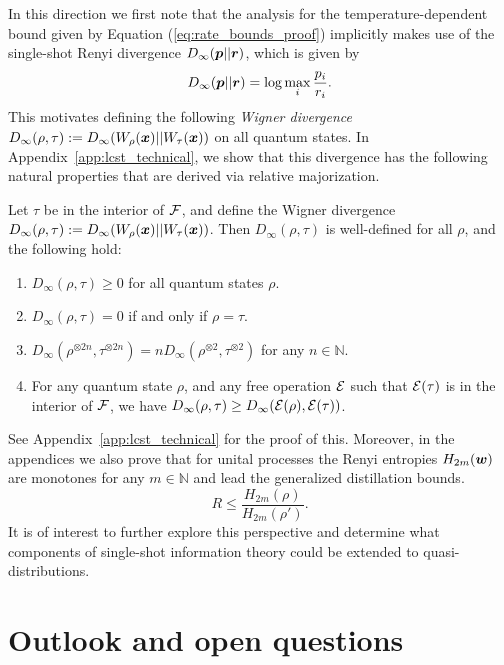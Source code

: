 \documentclass[pra,
aps,
twocolumn,
superscriptaddress,
groupedaddress,
nofootinbib,
reprint
]{revtex4-1}
\begin{document}
In this direction we first note that the analysis for the temperature-dependent bound given by Equation (\ref{eq:rate_bounds_proof}) implicitly makes use of the single-shot Renyi divergence $D_\infty (\boldsymbol{p} ||\boldsymbol{r})$, which is given by
\begin{equation}
D_\infty (\boldsymbol{p} ||\boldsymbol{r}) = \log \max_i \frac{p_i}{r_i}.
\end{equation}
This motivates defining the following \emph{Wigner divergence} $D_\infty(\rho, \tau) := D_\infty (W_\rho(\boldsymbol{x}) || W_\tau (\boldsymbol{x}))$ on all quantum states. In Appendix~\ref{app:lcst_technical}, we show that this divergence has the following natural properties that are derived via relative majorization.
\begin{theorem} Let $\tau$ be in the interior of ${\mathcal F}$, and define the Wigner divergence $D_\infty(\rho,\tau) := D_\infty(W_\rho(\boldsymbol{x}) || W_\tau (\boldsymbol{x}))$. Then $D_\infty(\rho, \tau)$ is well-defined for all $\rho$, and the following hold:
\begin{enumerate}
\item $D_\infty(\rho, \tau) \ge 0$ for all quantum states $\rho$.
\item  $D_\infty(\rho , \tau) = 0$ if and only if $\rho =\tau$.
\item $D_\infty(\rho^{\otimes 2n}, \tau^{\otimes 2n}) = n D_\infty(\rho^{\otimes 2} ,\tau^{\otimes 2})$ for any $n \in \mathbb{N}$.
\item For any quantum state $\rho$, and any free operation ${\mathcal E}$ such that ${\mathcal E}(\tau)$ is in the interior of ${\mathcal F}$, we have $D_\infty (\rho , \tau) \ge D_\infty ({\mathcal E}(\rho), {\mathcal E}(\tau))$.
\end{enumerate}
\end{theorem}
See Appendix~\ref{app:lcst_technical} for the proof of this. Moreover, in the appendices we also prove that for unital processes the Renyi entropies $H_{2m}(\boldsymbol{w})$ are monotones for any $m \in \mathbb{N}$ and lead the generalized distillation bounds.
\begin{equation}
R \le \frac{H_{2m}(\rho)}{H_{2m}(\rho')}.
\end{equation}
It is of interest to further explore this perspective and determine what components of single-shot information theory could be extended to quasi-distributions.

\section{Outlook and open questions}
\label{sec:lower_bounds}
\end{document}
